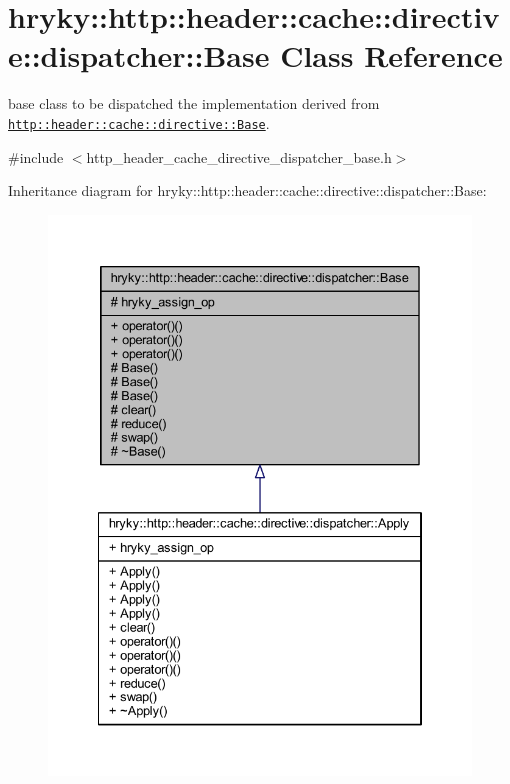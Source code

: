 \hypertarget{classhryky_1_1http_1_1header_1_1cache_1_1directive_1_1dispatcher_1_1_base}{\section{hryky\-:\-:http\-:\-:header\-:\-:cache\-:\-:directive\-:\-:dispatcher\-:\-:Base Class Reference}
\label{classhryky_1_1http_1_1header_1_1cache_1_1directive_1_1dispatcher_1_1_base}
}


base class to be dispatched the implementation derived from \href{http::header::cache::directive::Base}{\tt http\-::header\-::cache\-::directive\-::\-Base}.  




{\ttfamily \#include $<$http\-\_\-header\-\_\-cache\-\_\-directive\-\_\-dispatcher\-\_\-base.\-h$>$}



Inheritance diagram for hryky\-:\-:http\-:\-:header\-:\-:cache\-:\-:directive\-:\-:dispatcher\-:\-:Base\-:
\nopagebreak
\begin{figure}[H]
\begin{center}
\leavevmode
\includegraphics[width=334pt]{classhryky_1_1http_1_1header_1_1cache_1_1directive_1_1dispatcher_1_1_base__inherit__graph}
\end{center}
\end{figure}
